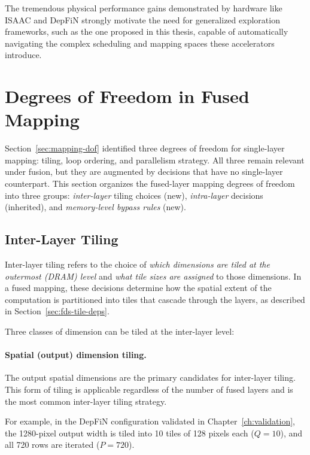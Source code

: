 The tremendous physical performance gains demonstrated by hardware like ISAAC and DepFiN strongly motivate the need for generalized exploration frameworks, such as the one proposed in this thesis, capable of automatically navigating the complex scheduling and mapping spaces these accelerators introduce.

\section{Degrees of Freedom in Fused Mapping}
\label{sec:fds-dof}

Section~\ref{sec:mapping-dof} identified three degrees of freedom
for single-layer mapping: tiling, loop ordering, and parallelism
strategy.
All three remain relevant under fusion, but they are augmented by
decisions that have no single-layer counterpart.
This section organizes the fused-layer mapping degrees of freedom into
three groups: \emph{inter-layer} tiling choices (new), \emph{intra-layer}
decisions (inherited), and \emph{memory-level bypass rules} (new).


\subsection{Inter-Layer Tiling}
\label{sec:fds-inter-tiling}

Inter-layer tiling refers to the choice of \emph{which dimensions are
tiled at the outermost (DRAM) level} and \emph{what tile sizes are
assigned} to those dimensions.
In a fused mapping, these decisions determine how the spatial extent
of the computation is partitioned into tiles that cascade through the
layers, as described in Section~\ref{sec:fds-tile-deps}.

Three classes of dimension can be tiled at the inter-layer level:

\paragraph{Spatial (output) dimension tiling.}
The output spatial dimensions are the primary candidates
for inter-layer tiling.
This form of tiling is applicable regardless of the number of fused
layers and is the most common inter-layer tiling strategy.

For example, in the DepFiN configuration validated in
Chapter~\ref{ch:validation}, the 1280-pixel output width is tiled into
10 tiles of 128 pixels each ($Q = 10$), and all 720 rows are
iterated ($P = 720$).

